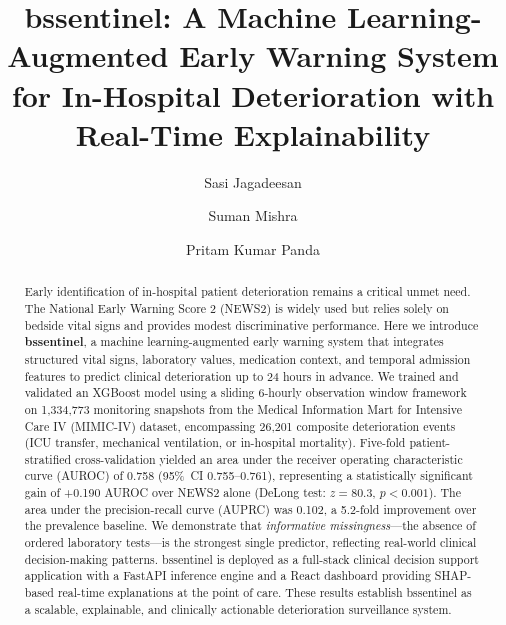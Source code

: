 \documentclass[12pt]{article}
\begin{document}
\title{\textbf{bssentinel: A Machine Learning-Augmented Early Warning System
for In-Hospital Deterioration with Real-Time Explainability}}

\author[1]{Sasi Jagadeesan}
\author[1]{Suman Mishra}
\author[1]{Pritam Kumar Panda}

\date{}
\maketitle

\begin{abstract}
\noindent
Early identification of in-hospital patient deterioration remains a critical
unmet need. The National Early Warning Score 2 (NEWS2) is widely used but
relies solely on bedside vital signs and provides modest discriminative
performance. Here we introduce \textbf{bssentinel}, a machine
learning-augmented early warning system that integrates structured vital
signs, laboratory values, medication context, and temporal admission features
to predict clinical deterioration up to 24 hours in advance. We trained and
validated an XGBoost model using a sliding 6-hourly observation window
framework on 1{,}334{,}773 monitoring snapshots from the Medical
Information Mart for Intensive Care IV (MIMIC-IV) dataset, encompassing
26{,}201 composite deterioration events (ICU transfer, mechanical ventilation,
or in-hospital mortality). Five-fold patient-stratified cross-validation
yielded an area under the receiver operating characteristic curve (AUROC) of
0.758 (95\%~CI 0.755--0.761), representing a statistically significant gain of
+0.190 AUROC over NEWS2 alone (DeLong test: $z = 80.3$, $p < 0.001$). The
area under the precision-recall curve (AUPRC) was 0.102, a 5.2-fold
improvement over the prevalence baseline. We demonstrate that \emph{informative
missingness}---the absence of ordered laboratory tests---is the strongest
single predictor, reflecting real-world clinical decision-making patterns.
bssentinel is deployed as a full-stack clinical decision support application
with a FastAPI inference engine and a React dashboard providing SHAP-based
real-time explanations at the point of care. These results establish bssentinel
as a scalable, explainable, and clinically actionable deterioration surveillance
system.
\end{abstract}
\end{document}
